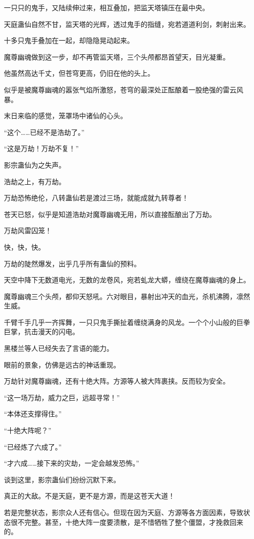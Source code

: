 \begin{this_body}
一只只的鬼手，又陆续伸过来，相互叠加，把监天塔镇压在最中央。

天庭蛊仙自然不甘，监天塔的光辉，透过鬼手的指缝，宛若道道利剑，刺射出来。

十多只鬼手叠加在一起，却隐隐晃动起来。

魔尊幽魂做到这一步，却不再管监天塔，三个头颅都昂首望天，目光凝重。

他虽然高达千丈，但苍穹更高，仍旧在他的头上。

似乎是被魔尊幽魂的嚣张气焰所激怒，苍穹的最深处正酝酿着一股绝强的雷云风暴。

末日来临的感觉，笼罩场中诸仙的心头。

“这个……已经不是浩劫了。”

“这是万劫！万劫不复！”

影宗蛊仙为之失声。

浩劫之上，有万劫。

万劫恐怖绝伦，八转蛊仙若是渡过三场，就能成就九转尊者！

苍天已怒，似乎是知道浩劫对魔尊幽魂无用，所以直接酝酿出了万劫。

万劫风雷囚笼！

快，快，快。

万劫的陡然爆发，出乎几乎所有蛊仙的预料。

天空中降下无数道电光，无数的龙卷风，宛若虬龙大蟒，缠绕在魔尊幽魂的身上。

魔尊幽魂三个头颅，都仰天怒吼。六对眼目，暴射出冲天的血光，杀机沸腾，凛然生威。

千臂千手几乎一齐挥舞，一只只鬼手撕扯着缠绕满身的风龙。一个个小山般的巨拳巨掌，抗击漫天的闪电。

黑楼兰等人已经失去了言语的能力。

眼前的景象，仿佛是远古的神话重现。

万劫针对魔尊幽魂，还有十绝大阵。方源等人被大阵裹挟。反而较为安全。

“这一场万劫，威力之巨，远超寻常！”

“本体还支撑得住。”

“十绝大阵呢？”

“已经炼了六成了。”

“才六成……接下来的灾劫，一定会越发恐怖。”

谈到这里，影宗蛊仙们纷纷沉默下来。

真正的大敌。不是天庭，更不是方源，而是这苍天大道！

若是完整状态，影宗众人还有信心。但现在因为天庭、方源等各方面因素，导致状态很不完整。甚至，十绝大阵一度要溃散，是不惜牺牲了整个僵盟，才挽救回来的。


\end{this_body}
